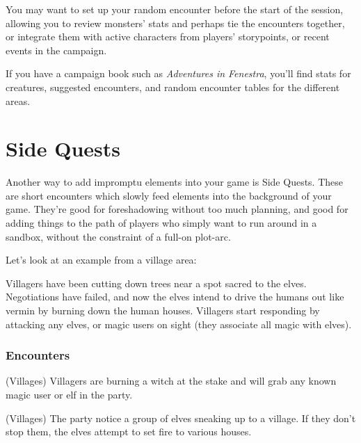 \begin{multicols}{2}
You may want to set up your random encounter before the start of the session, allowing you to review monsters' stats and perhaps tie the encounters together, or integrate them with active characters from players' \glspl{storypoint}, or recent events in the campaign.

If you have a campaign book such as \textit{Adventures in Fenestra}, you'll find stats for creatures, suggested encounters, and random encounter tables for the different areas.

\end{multicols}

\section{Side Quests}\label{sidequests}

\begin{multicols}{2}

\noindent
Another way to add impromptu elements into your game is Side Quests.
These are short encounters which slowly feed elements into the background of your game.
They're good for foreshadowing without too much planning, and good for adding things to the path of players who simply want to run around in a sandbox, without the constraint of a full-on plot-arc.

Let's look at an example from a village area:

\begin{exampletext}

	Villagers have been cutting down trees near a spot sacred to the elves.
	Negotiations have failed, and now the elves intend to drive the humans out like vermin by burning down the human houses.
	Villagers start responding by attacking any elves, or magic users on sight (they associate all magic with elves).

\end{exampletext}

\subsubsection{Encounters}

\begin{list}{\Square}{}

\item[\CheckedBox]{(Villages) Villagers are burning a witch at the stake and will grab any known magic user or elf in the party.}

\item{(Villages) The party notice a group of elves sneaking up to a village. If they don't stop them, the elves attempt to set fire to various houses.}


\end{list}
\end{multicols}
